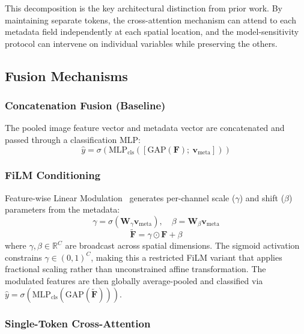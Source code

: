 \documentclass[12pt, a4paper]{article}
\newcommand{\sigmoid}{\sigma}
\newcommand{\R}{\mathbb{R}}
\begin{document}
This decomposition is the key architectural distinction from prior work. By maintaining separate tokens, the cross-attention mechanism can attend to each metadata field independently at each spatial location, and the model-sensitivity protocol can intervene on individual variables while preserving the others.

\subsection{Fusion Mechanisms}

\subsubsection{Concatenation Fusion (Baseline)}

The pooled image feature vector and metadata vector are concatenated and passed through a classification MLP:
\begin{equation}
    \hat{y} = \sigmoid\!\left(\text{MLP}_{\text{cls}}\left([\text{GAP}(\mathbf{F});\ \mathbf{v}_{\text{meta}}]\right)\right)
\end{equation}

\subsubsection{FiLM Conditioning}

Feature-wise Linear Modulation~\citep{perez2018film} generates per-channel scale ($\gamma$) and shift ($\beta$) parameters from the metadata:
\begin{equation}
    \gamma = \sigmoid(\mathbf{W}_\gamma \mathbf{v}_{\text{meta}}),\quad
    \beta = \mathbf{W}_\beta \mathbf{v}_{\text{meta}}
\end{equation}
\begin{equation}
    \tilde{\mathbf{F}} = \gamma \odot \mathbf{F} + \beta
\end{equation}
where $\gamma, \beta \in \R^C$ are broadcast across spatial dimensions. The sigmoid activation constrains $\gamma \in (0,1)^C$, making this a restricted FiLM variant that applies fractional scaling rather than unconstrained affine transformation. The modulated features are then globally average-pooled and classified via $\hat{y} = \sigmoid(\text{MLP}_{\text{cls}}(\text{GAP}(\tilde{\mathbf{F}})))$.

\subsubsection{Single-Token Cross-Attention}
\end{document}
